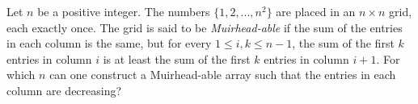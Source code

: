 Let $n$ be a positive integer.  The numbers $\{1, 2, ..., n^2\}$ are placed in an $n \times n$ grid, each exactly once.  The grid is said to be \textit{Muirhead-able} if the sum of the entries in each column is the same, but for every $1 \le i,k \le n-1$, the sum of the first $k$ entries in column $i$ is at least the sum of the first $k$ entries in column $i+1$.  For which $n$ can one construct a Muirhead-able array such that the entries in each column are decreasing?

